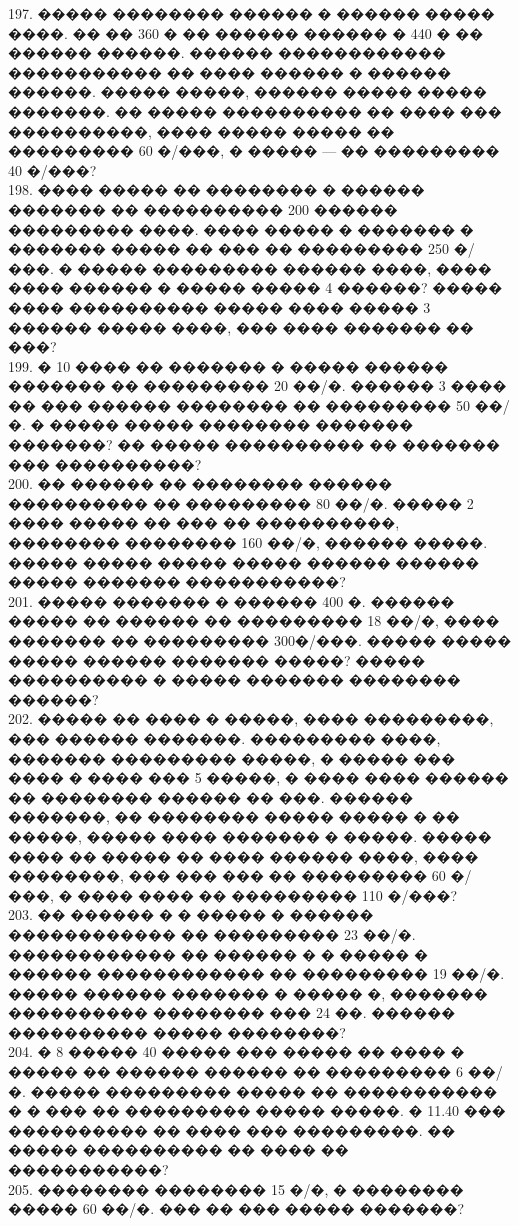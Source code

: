\documentclass[12pt]{article}
\begin{document}
197. ����� �������� ������ � ������ ����� ����. �� �� 360 � �� ������ ������ � 440 � �� ������ ������. ������ ������������ ����������� �� ���� ������ � ������ ������. ����� �����, ������ ����� ����� �������. �� ����� ���������� �� ���� ��� ����������, ���� ����� ����� �� ��������� 60 �/���, � ����� --- �� ��������� 40 �/���?\\
198. ���� ����� �� �������� � ������ ������� �� ���������� 200 ������ ��������� ����. ���� ����� � ������� � ������� ����� �� ��� �� ��������� 250 �/���. � ����� ��������� ������ ����, ���� ���� ������ � ����� ����� 4 ������? ����� ���� ���������� ����� ���� ����� 3 ������ ����� ����, ��� ���� ������� �� ���?\\
199.  � 10 ���� �� ������� � ����� ������ ������� �� ��������� 20 ��/�. ������ 3 ���� �� ��� ������ �������� �� ��������� 50 ��/�. � ����� ����� �������� ������� �������? �� ����� ���������� �� ������� ��� ����������?\\
200. �� ������ �� �������� ������ ���������� �� ��������� 80 ��/�. ����� 2 ���� ����� �� ��� �� ����������, �������� �������� 160 ��/�, ������ �����. ����� ����� ����� ����� ������ ������ ����� ������� �����������?\\
201.  ����� ������� � ������ 400 �. ������ ����� �� ������ �� ��������� 18 ��/�, ���� ������� �� ��������� 300�/���. ����� ����� ����� ������ ������� �����? ����� ���������� � ����� ������� �������� ������?\\
202. ����� �� ���� � �����, ���� ���������, ��� ������ �������. ��������� ����, ������� ��������� �����, � ����� ��� ���� � ���� ��� 5 �����, � ���� ���� ������ �� �������� ������ �� ���. ������ �������, �� �������� ����� ����� � �� �����, ����� ���� ������� � �����. ����� ���� �� ����� �� ���� ������ ����, ���� ��������, ��� ��� ��� �� ��������� 60 �/���, � ���� ���� �� ��������� 110 �/���?\\
203. �� ������ � � ����� � ������ ������������ �� ��������� 23 ��/�. ������������ �� ������ � � ����� � ������ ������������ �� ��������� 19 ��/�. ����� ������ ������� � ����� �, ������� ���������� �������� ��� 24 ��. ������ ���������� ����� ��������?\\
204. � 8 ����� 40 ����� ��� ����� �� ���� � ����� �� ������ ������ �� ��������� 6 ��/�. ����� ��������� ����� �� ����������� � � ��� �� ��������� ����� �����. � 11.40 ��� ���������� �� ���� ��� ���������. �� ����� ���������� �� ���� �� �����������?\\
205. �������� �������� 15 �/�, � �������� ����� 60 ��/�. ��� �� ��� ����� �������?\\
\end{document}
